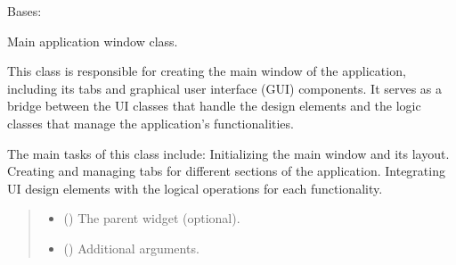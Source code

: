 \documentclass[letterpaper,10pt,english]{sphinxmanual}
\begin{document}
\begin{fulllineitems}
\label{\detokenize{main:main.MainWindow}}
\pysigstartsignatures
{}
\pysigstopsignatures
\sphinxAtStartPar
Bases: 

\sphinxAtStartPar
Main application window class.

\sphinxAtStartPar
This class is responsible for creating the main window of the application, including its tabs and graphical user interface (GUI) components. 
It serves as a bridge between the UI classes that handle the design elements and the logic classes that manage the application’s functionalities.

\sphinxAtStartPar
The main tasks of this class include:
\sphinxhyphen{} Initializing the main window and its layout.
\sphinxhyphen{} Creating and managing tabs for different sections of the application.
\sphinxhyphen{} Integrating UI design elements with the logical operations for each functionality.
\begin{quote}\begin{description}
\begin{itemize}
\item {} 
\sphinxAtStartPar
{} (\sphinxstyleliteralemphasis{\sphinxupquote{, }}) \textendash{} The parent widget (optional).

\item {} 
\sphinxAtStartPar
{} () \textendash{} Additional arguments.

\end{itemize}

\end{description}\end{quote}

\begin{fulllineitems}
\label{\detokenize{main:main.MainWindow.Helpg2Button}}
\pysigstartsignatures
{}
\pysigstopsignatures
\end{fulllineitems}


\end{fulllineitems}
\end{document}
